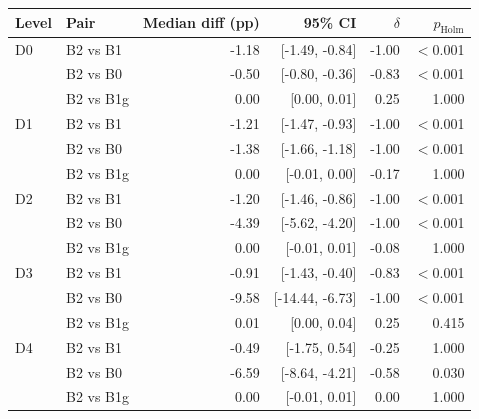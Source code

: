 \begin{tabular}{llrrrr}
\toprule
Level & Pair & Median diff (pp) & 95\% CI & $\delta$ & $p_{\mathrm{Holm}}$ \\
\midrule
D0 & B2 vs B1 & -1.18 & [-1.49, -0.84] & -1.00 & $<$0.001 \\
 & B2 vs B0 & -0.50 & [-0.80, -0.36] & -0.83 & $<$0.001 \\
 & B2 vs B1g & 0.00 & [0.00, 0.01] & 0.25 & 1.000 \\
\midrule
D1 & B2 vs B1 & -1.21 & [-1.47, -0.93] & -1.00 & $<$0.001 \\
 & B2 vs B0 & -1.38 & [-1.66, -1.18] & -1.00 & $<$0.001 \\
 & B2 vs B1g & 0.00 & [-0.01, 0.00] & -0.17 & 1.000 \\
\midrule
D2 & B2 vs B1 & -1.20 & [-1.46, -0.86] & -1.00 & $<$0.001 \\
 & B2 vs B0 & -4.39 & [-5.62, -4.20] & -1.00 & $<$0.001 \\
 & B2 vs B1g & 0.00 & [-0.01, 0.01] & -0.08 & 1.000 \\
\midrule
D3 & B2 vs B1 & -0.91 & [-1.43, -0.40] & -0.83 & $<$0.001 \\
 & B2 vs B0 & -9.58 & [-14.44, -6.73] & -1.00 & $<$0.001 \\
 & B2 vs B1g & 0.01 & [0.00, 0.04] & 0.25 & 0.415 \\
\midrule
D4 & B2 vs B1 & -0.49 & [-1.75, 0.54] & -0.25 & 1.000 \\
 & B2 vs B0 & -6.59 & [-8.64, -4.21] & -0.58 & 0.030 \\
 & B2 vs B1g & 0.00 & [-0.01, 0.01] & 0.00 & 1.000 \\
\bottomrule
\end{tabular}